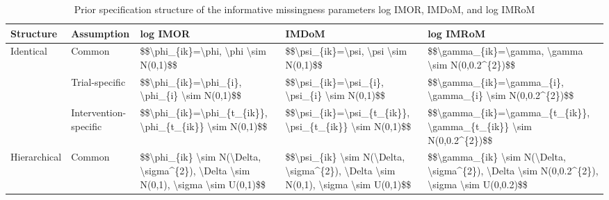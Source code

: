\begin{table}

\caption{\label{tab:table-one}Prior specification structure of the informative missingness parameters log IMOR, IMDoM, and log IMRoM}
\centering
\begin{tabu} to 
\hline
\textbf{Structure} & \textbf{Assumption} & \textbf{log IMOR} & \textbf{IMDoM} & \textbf{log IMRoM}\\
\hline
Identical & Common & \$\$\textbackslash{}phi\_\{ik\}=\textbackslash{}phi, \textbackslash{}phi \textbackslash{}sim N(0,1)\$\$ & \$\$\textbackslash{}psi\_\{ik\}=\textbackslash{}psi, \textbackslash{}psi \textbackslash{}sim N(0,1)\$\$ & \$\$\textbackslash{}gamma\_\{ik\}=\textbackslash{}gamma, \textbackslash{}gamma \textbackslash{}sim N(0,0.2\textasciicircum{}\{2\})\$\$\\
\hline
 & Trial-specific & \$\$\textbackslash{}phi\_\{ik\}=\textbackslash{}phi\_\{i\}, \textbackslash{}phi\_\{i\} \textbackslash{}sim N(0,1)\$\$ & \$\$\textbackslash{}psi\_\{ik\}=\textbackslash{}psi\_\{i\}, \textbackslash{}psi\_\{i\} \textbackslash{}sim N(0,1)\$\$ & \$\$\textbackslash{}gamma\_\{ik\}=\textbackslash{}gamma\_\{i\}, \textbackslash{}gamma\_\{i\} \textbackslash{}sim N(0,0.2\textasciicircum{}\{2\})\$\$\\
\hline
 & Intervention-specific & \$\$\textbackslash{}phi\_\{ik\}=\textbackslash{}phi\_\{t\_\{ik\}\}, \textbackslash{}phi\_\{t\_\{ik\}\} \textbackslash{}sim N(0,1)\$\$ & \$\$\textbackslash{}psi\_\{ik\}=\textbackslash{}psi\_\{t\_\{ik\}\}, \textbackslash{}psi\_\{t\_\{ik\}\} \textbackslash{}sim N(0,1)\$\$ & \$\$\textbackslash{}gamma\_\{ik\}=\textbackslash{}gamma\_\{t\_\{ik\}\}, \textbackslash{}gamma\_\{t\_\{ik\}\} \textbackslash{}sim N(0,0.2\textasciicircum{}\{2\})\$\$\\
\hline
Hierarchical & Common & \$\$\textbackslash{}phi\_\{ik\} \textbackslash{}sim N(\textbackslash{}Delta, \textbackslash{}sigma\textasciicircum{}\{2\}), \textbackslash{}Delta \textbackslash{}sim N(0,1), \textbackslash{}sigma \textbackslash{}sim U(0,1)\$\$ & \$\$\textbackslash{}psi\_\{ik\} \textbackslash{}sim N(\textbackslash{}Delta, \textbackslash{}sigma\textasciicircum{}\{2\}), \textbackslash{}Delta \textbackslash{}sim N(0,1), \textbackslash{}sigma \textbackslash{}sim U(0,1)\$\$ & \$\$\textbackslash{}gamma\_\{ik\} \textbackslash{}sim N(\textbackslash{}Delta, \textbackslash{}sigma\textasciicircum{}\{2\}), \textbackslash{}Delta \textbackslash{}sim N(0,0.2\textasciicircum{}\{2\}), \textbackslash{}sigma \textbackslash{}sim U(0,0.2)\$\$\\

\end{tabu}
\end{table}
